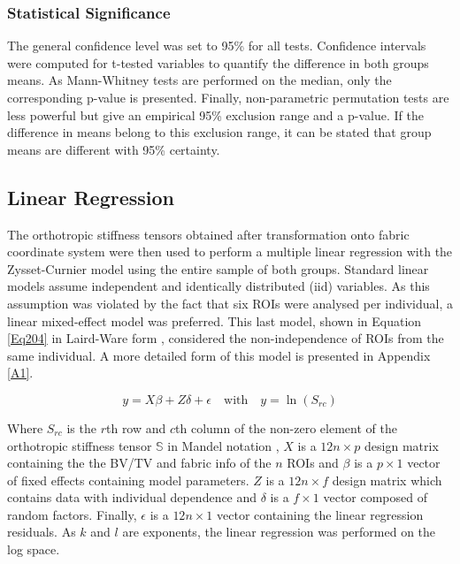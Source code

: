 \documentclass[a4paper,fleqn]{DC_ArtStyle}
\begin{document}
	\subsubsection{Statistical Significance}
	The general confidence level was set to 95\% for all tests. Confidence intervals were computed for t-tested variables to quantify the difference in both groups means. As Mann-Whitney tests are performed on the median, only the corresponding p-value is presented. Finally, non-parametric permutation tests are less powerful but give an empirical 95\% exclusion range and a p-value. If the difference in means belong to this exclusion range, it can be stated that group means are different with 95\% certainty.
	
	\subsection{Linear Regression}
	The orthotropic stiffness tensors obtained after transformation onto fabric coordinate system were then used to perform a multiple linear regression with the Zysset-Curnier model using the entire sample of both groups. Standard linear models assume independent and identically distributed (iid) variables. As this assumption was violated by the fact that six ROIs were analysed per individual, a linear mixed-effect model was preferred. This last model, shown in Equation \ref{Eq204} in Laird-Ware form \cite{Laird1982}, considered the non-independence of ROIs from the same individual. A more detailed form of this model is presented in Appendix \ref{A1}.
	
	\begin{equation}
	y = X \beta + Z \delta + \epsilon \quad \text{with} \quad y = \ln(S_{rc})
	\label{Eq204}
	\end{equation}
	
	Where $S_{rc}$ is the $r$th row and $c$th column of the non-zero element of the orthotropic stiffness tensor $\mathbb{S}$ in Mandel notation \cite{MANDEL1965}, $X$ is a $12 n \times p$ design matrix containing the the BV/TV and fabric info of the $n$ ROIs and $\beta$ is a $p \times 1$ vector of fixed effects containing model parameters. $Z$ is a $12 n \times f$ design matrix which contains data with individual dependence and $\delta$ is a $f \times 1$ vector composed of random factors. Finally, $\epsilon$ is a $12n \times 1$ vector containing the linear regression residuals. As $k$ and $l$ are exponents, the linear regression was performed on the log space.\\
	
\end{document}
